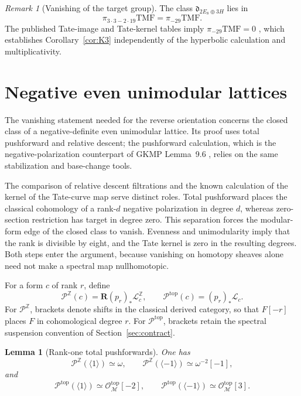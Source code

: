 \documentclass[11pt,a4paper]{amsart}
\newcommand{\Z}{\mathbb Z}
\newcommand{\TMF}{\mathrm{TMF}}
\newcommand{\cM}{\mathcal M}
\newcommand{\cL}{\mathcal L}
\newcommand{\cO}{\mathcal O}
\newcommand{\dclass}{\mathfrak d}
\theoremstyle{plain}
\newtheorem{lemma}[theorem]{Lemma}
\theoremstyle{definition}
\theoremstyle{remark}
\newtheorem{remark}[theorem]{Remark}
\begin{document}
\begin{remark}[Vanishing of the target group]\label{rem:K3-target}
The class $\dclass_{2E_8\oplus3H}$ lies in
\[
 \pi_{3\cdot3-2\cdot19}\TMF=\pi_{-29}\TMF.
\]
The published Tate-image and Tate-kernel tables imply
$\pi_{-29}\TMF=0$ \cite[Appendix~C]{TY}, which establishes
Corollary~\ref{cor:K3} independently of the hyperbolic calculation
and multiplicativity.
\end{remark}

\section{Negative even unimodular lattices}\label{sec:negative}

The vanishing statement needed for the reverse orientation concerns the
closed class of a negative-definite even unimodular lattice. Its proof
uses total pushforward and relative descent; the pushforward calculation,
which is the negative-polarization counterpart of GKMP Lemma~9.6
\cite{GKMP}, relies on the same stabilization and base-change tools.

The comparison of relative descent filtrations and the known calculation
of the kernel of the Tate-curve map serve distinct roles. Total
pushforward places the classical cohomology of a rank-$d$ negative
polarization in degree $d$, whereas zero-section restriction has target
in degree zero. This separation forces the modular-form edge of the
closed class to vanish. Evenness and unimodularity imply that the rank
is divisible by eight, and the Tate kernel is zero in the resulting
degrees. Both steps enter the argument, because vanishing on homotopy
sheaves alone need not make a spectral map nullhomotopic.

For a form $c$ of rank $r$, define
\[
 \mathcal P^{\Z}(c)=\mathbf R(p_r)_*\cL_c^{\Z},
 \qquad
 \mathcal P^{\mathrm{top}}(c)=(p_r)_*\cL_c.
\]
For $\mathcal P^{\Z}$, brackets denote shifts in the classical
derived category, so that $F[-r]$ places $F$ in cohomological degree $r$.
For $\mathcal P^{\mathrm{top}}$, brackets retain the spectral
suspension convention of Section~\ref{sec:contract}.

\begin{lemma}[Rank-one total pushforwards]\label{lem:rankone-push}
One has
\[
 \mathcal P^{\Z}(\langle1\rangle)\simeq\omega,
 \qquad
 \mathcal P^{\Z}(\langle-1\rangle)\simeq\omega^{-2}[-1],
\]
and
\[
 \mathcal P^{\mathrm{top}}(\langle1\rangle)\simeq\cO_{\cM}^{\mathrm{top}}[-2],
 \qquad
 \mathcal P^{\mathrm{top}}(\langle-1\rangle)\simeq\cO_{\cM}^{\mathrm{top}}[3].
\]
\end{lemma}
\end{document}
